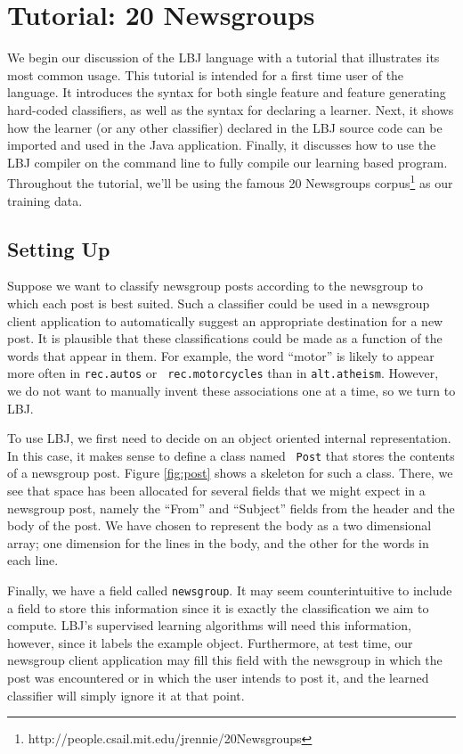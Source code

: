 
\chapter{Tutorial: 20 Newsgroups}

We begin our discussion of the LBJ language with a tutorial that illustrates
its most common usage.  This tutorial is intended for a first time user of the
language.  It introduces the syntax for both single feature and feature
generating hard-coded classifiers, as well as the syntax for declaring a
learner.  Next, it shows how the learner (or any other classifier) declared in
the LBJ source code can be imported and used in the Java application.
Finally, it discusses how to use the LBJ compiler on the command line to fully
compile our learning based program.  Throughout the tutorial, we'll be using
the famous 20 Newsgroups
corpus\footnote{http://people.csail.mit.edu/jrennie/20Newsgroups} as our
training data.

\section{Setting Up}

Suppose we want to classify newsgroup posts according to the newsgroup to
which each post is best suited.  Such a classifier could be used in a
newsgroup client application to automatically suggest an appropriate
destination for a new post.  It is plausible that these classifications could
be made as a function of the words that appear in them.  For example, the word
``motor'' is likely to appear more often in {\tt rec.autos} or {\tt
rec.motorcycles} than in {\tt alt.atheism}.  However, we do not want to
manually invent these associations one at a time, so we turn to LBJ.

To use LBJ, we first need to decide on an object oriented internal
representation.  In this case, it makes sense to define a class named {\tt
Post} that stores the contents of a newsgroup post.  Figure \ref{fig:post}
shows a skeleton for such a class.  There, we see that space has been
allocated for several fields that we might expect in a newsgroup post, namely
the ``From'' and ``Subject'' fields from the header and the body of the post.
We have chosen to represent the body as a two dimensional array; one dimension
for the lines in the body, and the other for the words in each line.

Finally, we have a field called {\tt newsgroup}.  It may seem counterintuitive
to include a field to store this information since it is exactly the
classification we aim to compute.  LBJ's supervised learning algorithms will
need this information, however, since it labels the example object.
Furthermore, at test time, our newsgroup client application may fill this
field with the newsgroup in which the post was encountered or in which the
user intends to post it, and the learned classifier will simply ignore it at
that point.

